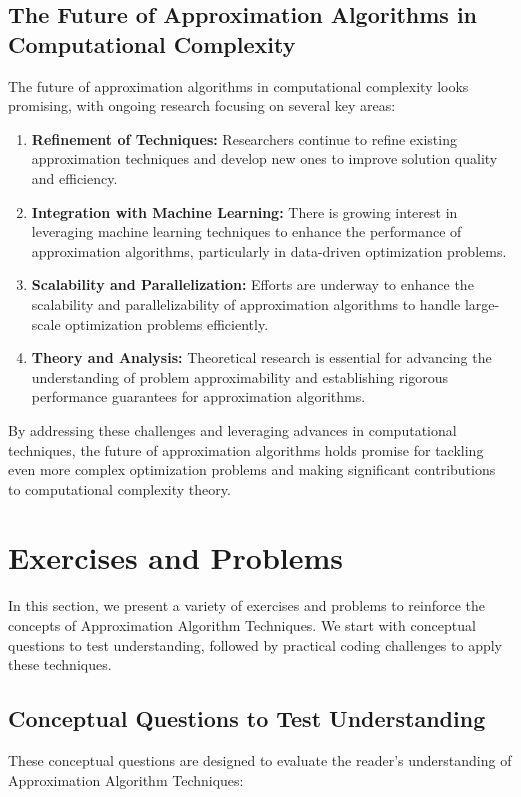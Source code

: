 \documentclass[12pt]{book} %
\begin{document}
\subsection{The Future of Approximation Algorithms in Computational Complexity}

The future of approximation algorithms in computational complexity looks promising, with ongoing research focusing on several key areas:

\begin{enumerate}
    \item \textbf{Refinement of Techniques:} Researchers continue to refine existing approximation techniques and develop new ones to improve solution quality and efficiency.
    \item \textbf{Integration with Machine Learning:} There is growing interest in leveraging machine learning techniques to enhance the performance of approximation algorithms, particularly in data-driven optimization problems.
    \item \textbf{Scalability and Parallelization:} Efforts are underway to enhance the scalability and parallelizability of approximation algorithms to handle large-scale optimization problems efficiently.
    \item \textbf{Theory and Analysis:} Theoretical research is essential for advancing the understanding of problem approximability and establishing rigorous performance guarantees for approximation algorithms.
\end{enumerate}

By addressing these challenges and leveraging advances in computational techniques, the future of approximation algorithms holds promise for tackling even more complex optimization problems and making significant contributions to computational complexity theory.

\section{Exercises and Problems}
In this section, we present a variety of exercises and problems to reinforce the concepts of Approximation Algorithm Techniques. We start with conceptual questions to test understanding, followed by practical coding challenges to apply these techniques.

\subsection{Conceptual Questions to Test Understanding}
These conceptual questions are designed to evaluate the reader's understanding of Approximation Algorithm Techniques:
\end{document}
